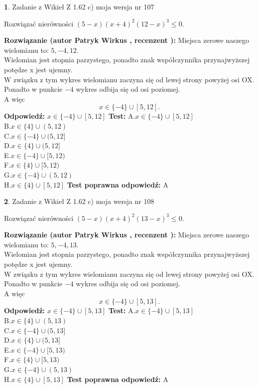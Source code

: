 \documentclass[12pt, a4paper]{article}
\theoremstyle{definition} %
\newtheorem{zad}{}
\newcommand{\zadStart}[1]{\begin{zad}#1\newline}
\newcommand{\zadStop}{\end{zad}}
\newcommand{\rozwStart}[2]{\noindent \textbf{Rozwiązanie (autor #1 , recenzent #2): }\newline}
\newcommand{\rozwStop}{\newline}
\newcommand{\odpStart}{\noindent \textbf{Odpowiedź:}\newline}
\newcommand{\odpStop}{\newline}
\newcommand{\testStart}{\noindent \textbf{Test:}\newline}
\newcommand{\testStop}{\newline}
\newcommand{\kluczStart}{\noindent \textbf{Test poprawna odpowiedź:}\newline}
\newcommand{\kluczStop}{\newline}
\begin{document}
\zadStart{Zadanie z Wikieł Z 1.62 c) moja wersja nr 107}

Rozwiązać nierówności $(5-x)(x+4)^{2}(12-x)^{3}\le0$.
\zadStop
\rozwStart{Patryk Wirkus}{}
Miejsca zerowe naszego wielomianu to: $5, -4, 12$.\\
Wielomian jest stopnia parzystego, ponadto znak współczynnika przy\linebreak najwyższej potędze x jest ujemny.\\ W związku z tym wykres wielomianu zaczyna się od lewej strony powyżej osi OX.\\
Ponadto w punkcie $-4$ wykres odbija się od osi poziomej.\\
A więc $$x \in \{-4\} \cup [5,12].$$
\rozwStop
\odpStart
$x \in \{-4\} \cup [5,12]$
\odpStop
\testStart
A.$x \in \{-4\} \cup [5,12]$\\
B.$x \in \{4\} \cup (5,12)$\\
C.$x \in \{-4\} \cup (5,12]$\\
D.$x \in \{4\} \cup (5,12]$\\
E.$x \in \{-4\} \cup [5,12)$\\
F.$x \in \{4\} \cup [5,12)$\\
G.$x \in \{-4\} \cup (5,12)$\\
H.$x \in \{4\} \cup [5,12]$
\testStop
\kluczStart
A
\kluczStop



\zadStart{Zadanie z Wikieł Z 1.62 c) moja wersja nr 108}

Rozwiązać nierówności $(5-x)(x+4)^{2}(13-x)^{3}\le0$.
\zadStop
\rozwStart{Patryk Wirkus}{}
Miejsca zerowe naszego wielomianu to: $5, -4, 13$.\\
Wielomian jest stopnia parzystego, ponadto znak współczynnika przy\linebreak najwyższej potędze x jest ujemny.\\ W związku z tym wykres wielomianu zaczyna się od lewej strony powyżej osi OX.\\
Ponadto w punkcie $-4$ wykres odbija się od osi poziomej.\\
A więc $$x \in \{-4\} \cup [5,13].$$
\rozwStop
\odpStart
$x \in \{-4\} \cup [5,13]$
\odpStop
\testStart
A.$x \in \{-4\} \cup [5,13]$\\
B.$x \in \{4\} \cup (5,13)$\\
C.$x \in \{-4\} \cup (5,13]$\\
D.$x \in \{4\} \cup (5,13]$\\
E.$x \in \{-4\} \cup [5,13)$\\
F.$x \in \{4\} \cup [5,13)$\\
G.$x \in \{-4\} \cup (5,13)$\\
H.$x \in \{4\} \cup [5,13]$
\testStop
\kluczStart
A
\kluczStop
\end{document}
